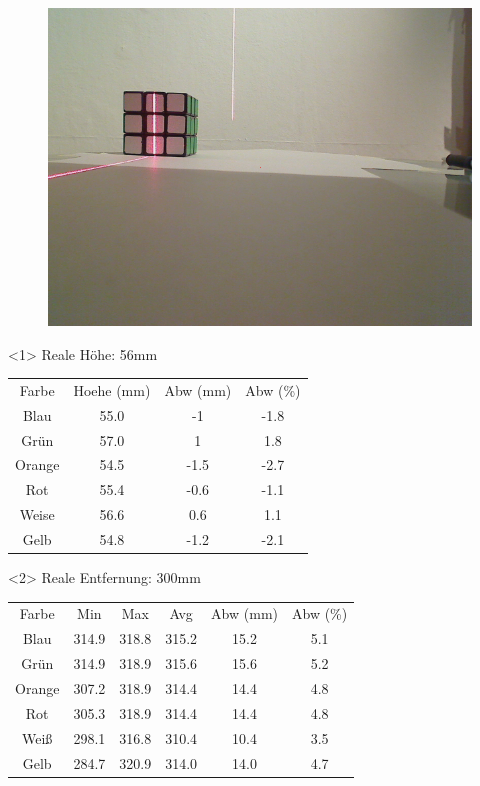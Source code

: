 \documentclass{beamer}
\begin{document}
\begin{frame}
\begin{figure}
\begin{minipage}{0.32\linewidth}
		\end{minipage}
		\hfill
		\begin{minipage}{0.32\linewidth}
			\includegraphics[width=\linewidth]{includes/test_color_3}
		\end{minipage}
	\end{figure}

	\begin{onlyenv}
		Reale Höhe: 56mm
		\begin{tabular}{c|c|c|c}
			Farbe & Hoehe (mm) & Abw (mm) & Abw (\%) \\
			Blau & 55.0 & -1 & -1.8\\
			Grün & 57.0 & 1 & 1.8\\
			Orange & 54.5 & -1.5 & -2.7\\
			Rot & 55.4 & -0.6 & -1.1\\
			Weise & 56.6 & 0.6 & 1.1\\
			Gelb & 54.8 & -1.2 & -2.1	
		\end{tabular}
	\end{onlyenv}
	\begin{onlyenv}
		Reale Entfernung: 300mm 
		\begin{tabular}{c|c|c|c|c|c}
			Farbe & Min & Max & Avg & Abw (mm) & Abw (\%)\\
			Blau & 314.9 & 318.8 & 315.2 & 15.2 & 5.1\\
			Grün & 314.9 & 318.9 & 315.6 & 15.6 & 5.2\\
			Orange & 307.2 & 318.9 & 314.4 & 14.4 & 4.8\\
			Rot & 305.3 & 318.9 & 314.4 & 14.4 & 4.8\\
			Weiß & 298.1 & 316.8 & 310.4 & 10.4 & 3.5\\
			Gelb & 284.7 & 320.9 & 314.0 & 14.0 & 4.7
		\end{tabular}
	\end{onlyenv}

\end{frame}
\end{document}
